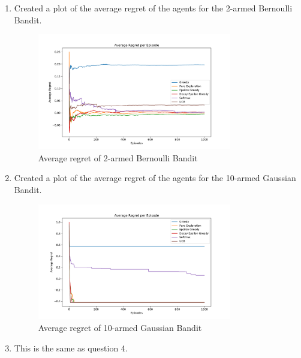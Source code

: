 \begin{enumerate}
    \item Created a plot of the average regret of the agents for the 2-armed Bernoulli Bandit. 
    \begin{figure}[h]
        \centering
        \includegraphics[width=0.8\textwidth]{images/mab/bernoulli_average_regret_per_episode.pdf}
        \caption{Average regret of 2-armed Bernoulli Bandit}
        \label{fig:bernoulli_regret}
    \end{figure}

    \item Created a plot of the average regret of the agents for the 10-armed Gaussian Bandit.
    \begin{figure}[h]
        \centering
        \includegraphics[width=0.8\textwidth]{images/mab/10_arm_gaussian_average_regret_per_episode.pdf}
        \caption{Average regret of 10-armed Gaussian Bandit}
        \label{fig:gaussian_regret}
    \end{figure}

    \item This is the same as question 4. 
    

\end{enumerate}
